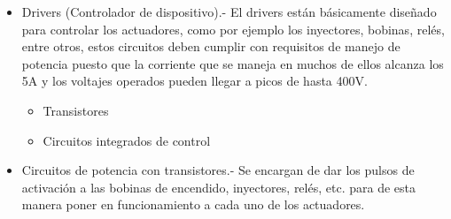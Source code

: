 \begin{itemize}
\begin{itemize}
        De esta forma es que todas las señales micro procesadas son convertidas de digitales en análogas para controlar a los actuadores. El convertidor digital recibe un número de 8 BITS y la trasforma en una tensión continua de un valor proporcional al número digital.
        \item Drivers (Controlador de dispositivo).- El drivers están básicamente diseñado para controlar los actuadores, como por ejemplo los inyectores, bobinas, relés, entre otros, estos circuitos deben cumplir con requisitos de manejo de potencia puesto que la corriente que se maneja en muchos de ellos alcanza los 5A y los voltajes operados pueden llegar a picos de hasta 400V.
        \begin{itemize}
            \item Transistores
            \item Circuitos integrados de control
        \end{itemize}
        \item Circuitos de potencia con transistores.- Se encargan de dar los pulsos de activación a las bobinas de encendido, inyectores, relés, etc. para de esta manera poner en funcionamiento a cada uno de los actuadores. 
        

\end{itemize}
\end{itemize}
